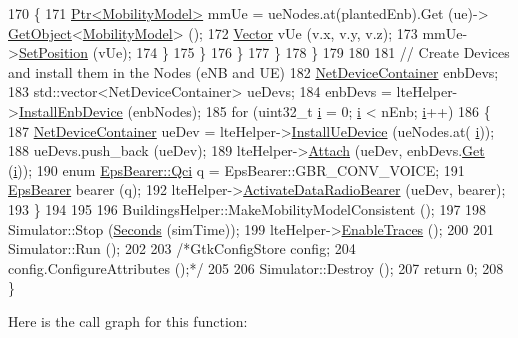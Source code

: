 \begin{DoxyCode}
170                     \{
171                       \hyperlink{classns3_1_1Ptr}{Ptr<MobilityModel>} mmUe = ueNodes.at(plantedEnb).Get (ue)->
      \hyperlink{classns3_1_1Object_a13e18c00017096c8381eb651d5bd0783}{GetObject}<\hyperlink{classns3_1_1MobilityModel}{MobilityModel}> ();
172                       \hyperlink{classns3_1_1Vector3D_a7e59b47bc94c9cb1dadff68c1d0112d8}{Vector} vUe (v.x, v.y, v.z);
173                       mmUe->\hyperlink{classns3_1_1MobilityModel_ac584b3d5a309709d2f13ed6ada1e7640}{SetPosition} (vUe);
174                     \}
175                 \}
176             \}
177         \}
178     \}
179 
180 
181   \textcolor{comment}{// Create Devices and install them in the Nodes (eNB and UE)}
182   \hyperlink{classns3_1_1NetDeviceContainer}{NetDeviceContainer} enbDevs;
183   std::vector<NetDeviceContainer> ueDevs;
184   enbDevs = lteHelper->\hyperlink{classns3_1_1LteHelper_a5e009ad35ef85f46b5a6099263f15a03}{InstallEnbDevice} (enbNodes);
185   \textcolor{keywordflow}{for} (uint32\_t \hyperlink{bernuolliDistribution_8m_a6f6ccfcf58b31cb6412107d9d5281426}{i} = 0; \hyperlink{bernuolliDistribution_8m_a6f6ccfcf58b31cb6412107d9d5281426}{i} < nEnb; \hyperlink{bernuolliDistribution_8m_a6f6ccfcf58b31cb6412107d9d5281426}{i}++)
186     \{
187       \hyperlink{classns3_1_1NetDeviceContainer}{NetDeviceContainer} ueDev = lteHelper->\hyperlink{classns3_1_1LteHelper_ac9cd932d7de92811cfa953c2e3b2fc9f}{InstallUeDevice} (ueNodes.at(
      \hyperlink{bernuolliDistribution_8m_a6f6ccfcf58b31cb6412107d9d5281426}{i}));
188       ueDevs.push\_back (ueDev);
189       lteHelper->\hyperlink{classns3_1_1LteHelper_a9466743f826aa2652a87907b7f0a1c87}{Attach} (ueDev, enbDevs.\hyperlink{classns3_1_1NetDeviceContainer_a677d62594b5c9d2dea155cc5045f4d0b}{Get} (\hyperlink{bernuolliDistribution_8m_a6f6ccfcf58b31cb6412107d9d5281426}{i}));
190       \textcolor{keyword}{enum} \hyperlink{structns3_1_1EpsBearer_aecf0c67109c5eb4ec0b07226fff5885e}{EpsBearer::Qci} q = EpsBearer::GBR\_CONV\_VOICE;
191       \hyperlink{structns3_1_1EpsBearer}{EpsBearer} bearer (q);
192       lteHelper->\hyperlink{classns3_1_1LteHelper_ac896e16cf162e4beeaa292d39ab1b700}{ActivateDataRadioBearer} (ueDev, bearer);
193     \}
194 
195 
196   BuildingsHelper::MakeMobilityModelConsistent ();
197 
198   Simulator::Stop (\hyperlink{group__timecivil_ga33c34b816f8ff6628e33d5c8e9713b9e}{Seconds} (simTime));
199   lteHelper->\hyperlink{classns3_1_1LteHelper_aeb70fd96f1c58806a5b7ad9f68a795e0}{EnableTraces} ();
200 
201   Simulator::Run ();
202 
203   \textcolor{comment}{/*GtkConfigStore config;}
204 \textcolor{comment}{  config.ConfigureAttributes ();*/}
205 
206   Simulator::Destroy ();
207   \textcolor{keywordflow}{return} 0;
208 \}
\end{DoxyCode}


Here is the call graph for this function\+:


